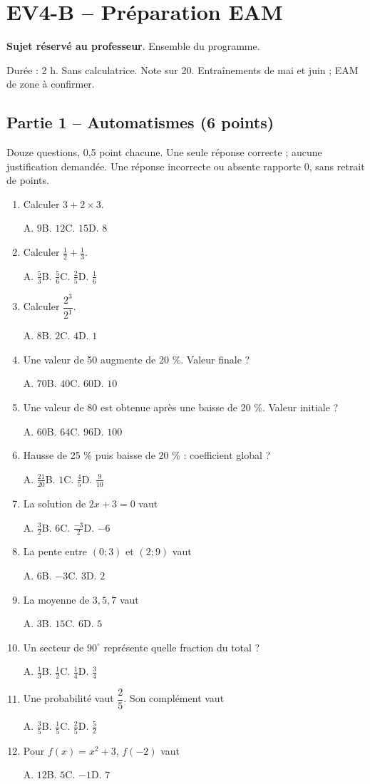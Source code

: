 \clearpage\section*{EV4-B -- Préparation EAM}\label{EV4-B}
\textbf{Sujet réservé au professeur}. Ensemble du programme.\par Durée : 2 h. Sans calculatrice. Note sur 20. Entraînements de mai et juin ; EAM de zone à confirmer.
\subsection*{Partie 1 -- Automatismes (6 points)}
Douze questions, 0,5 point chacune. Une seule réponse correcte ; aucune justification demandée. Une réponse incorrecte ou absente rapporte 0, sans retrait de points.
\begin{enumerate}
\item Calculer $3+2\times3$.\par A. $9$\quad B. $12$\quad C. $15$\quad D. $8$
\item Calculer $\frac12+\frac13$.\par A. $\frac{5}{3}$\quad B. $\frac{5}{6}$\quad C. $\frac{2}{5}$\quad D. $\frac{1}{6}$
\item Calculer $\dfrac{2^3}{2^{1}}$.\par A. $8$\quad B. $2$\quad C. $4$\quad D. $1$
\item Une valeur de 50 augmente de 20 \%. Valeur finale ?\par A. $70$\quad B. $40$\quad C. $60$\quad D. $10$
\item Une valeur de 80 est obtenue après une baisse de 20 \%. Valeur initiale ?\par A. $60$\quad B. $64$\quad C. $96$\quad D. $100$
\item Hausse de 25 \% puis baisse de 20 \% : coefficient global ?\par A. $\frac{21}{20}$\quad B. $1$\quad C. $\frac{4}{5}$\quad D. $\frac{9}{10}$
\item La solution de $2x+3=0$ vaut\par A. $\frac{3}{2}$\quad B. $6$\quad C. $\frac{-3}{2}$\quad D. $-6$
\item La pente entre $(0;3)$ et $(2;9)$ vaut\par A. $6$\quad B. $-3$\quad C. $3$\quad D. $2$
\item La moyenne de $3, 5, 7$ vaut\par A. $3$\quad B. $15$\quad C. $6$\quad D. $5$
\item Un secteur de $90^\circ$ représente quelle fraction du total ?\par A. $\frac{1}{3}$\quad B. $\frac{1}{2}$\quad C. $\frac{1}{4}$\quad D. $\frac{3}{4}$
\item Une probabilité vaut $\dfrac{2}{5}$. Son complément vaut\par A. $\frac{3}{5}$\quad B. $\frac{1}{5}$\quad C. $\frac{2}{5}$\quad D. $\frac{5}{2}$
\item Pour $f(x)=x^2+3$, $f(-2)$ vaut\par A. $12$\quad B. $5$\quad C. $-1$\quad D. $7$
\end{enumerate}
